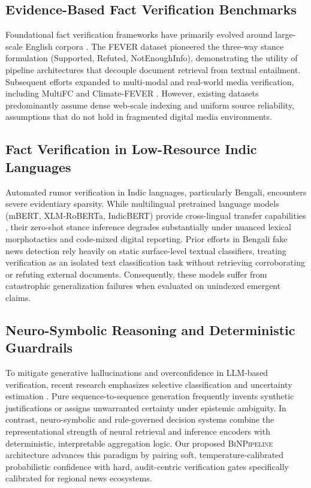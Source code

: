 \documentclass[11pt,a4paper]{article}
\begin{document}
\subsection{Evidence-Based Fact Verification Benchmarks}
Foundational fact verification frameworks have primarily evolved around large-scale English corpora \cite{thorne2018fever}. The FEVER dataset pioneered the three-way stance formulation (Supported, Refuted, NotEnoughInfo), demonstrating the utility of pipeline architectures that decouple document retrieval from textual entailment. Subsequent efforts expanded to multi-modal and real-world media verification, including MultiFC and Climate-FEVER \cite{augenstein2019multifc}. However, existing datasets predominantly assume dense web-scale indexing and uniform source reliability, assumptions that do not hold in fragmented digital media environments.

\subsection{Fact Verification in Low-Resource Indic Languages}
Automated rumor verification in Indic languages, particularly Bengali, encounters severe evidentiary sparsity. While multilingual pretrained language models (mBERT, XLM-RoBERTa, IndicBERT) provide cross-lingual transfer capabilities \cite{conneau2019unsupervised, kakwani2020indicnlpsuite}, their zero-shot stance inference degrades substantially under nuanced lexical morphotactics and code-mixed digital reporting. Prior efforts in Bengali fake news detection rely heavily on static surface-level textual classifiers, treating verification as an isolated text classification task without retrieving corroborating or refuting external documents. Consequently, these models suffer from catastrophic generalization failures when evaluated on unindexed emergent claims.

\subsection{Neuro-Symbolic Reasoning and Deterministic Guardrails}
To mitigate generative hallucinations and overconfidence in LLM-based verification, recent research emphasizes selective classification and uncertainty estimation \cite{guo2017calibration}. Pure sequence-to-sequence generation frequently invents synthetic justifications or assigns unwarranted certainty under epistemic ambiguity. In contrast, neuro-symbolic and rule-governed decision systems combine the representational strength of neural retrieval and inference encoders with deterministic, interpretable aggregation logic. Our proposed \textsc{BiNPipeline} architecture advances this paradigm by pairing soft, temperature-calibrated probabilistic confidence with hard, audit-centric verification gates specifically calibrated for regional news ecosystems.
\end{document}
